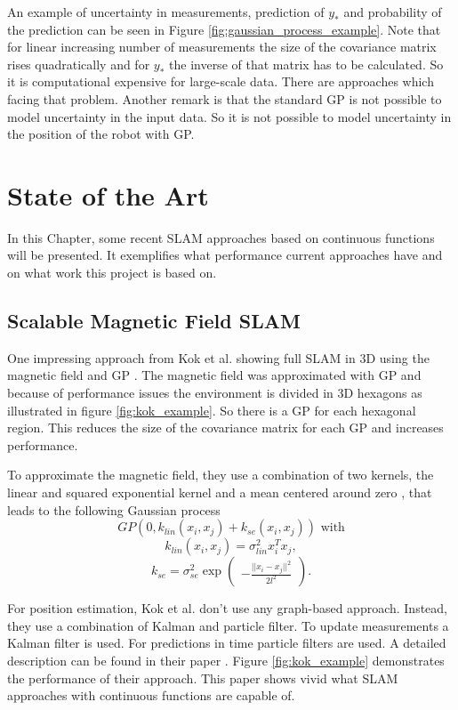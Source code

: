 An example of uncertainty in measurements, prediction of $y_*$ and probability of the prediction can be seen in Figure \ref{fig:gaussian_process_example}. Note that for linear increasing number of measurements the size of the covariance matrix rises quadratically and for $y_*$ the inverse of that matrix has to be calculated. So it is computational expensive for large-scale data. There are approaches which facing that problem. Another remark is that the standard GP is not possible to model uncertainty in the input data. So it is not possible to model uncertainty in the position of the robot with GP. 

\section{State of the Art}
\label{chap:stat_of_the_art}

In this Chapter, some recent SLAM approaches based on continuous functions will be presented. It exemplifies what performance current approaches have and on what work this project is based on. 

\subsection{Scalable Magnetic Field SLAM}
\label{sec:scalable_magnetic_slam}

One impressing approach from Kok et al. showing full SLAM in 3D using the magnetic field and GP \cite{kok_scalable_2018}. The magnetic field was approximated with GP and because of performance issues the environment is divided in 3D hexagons as illustrated in figure \ref{fig:kok_example}. So there is a GP for each hexagonal region. This reduces the size of the covariance matrix for each GP and increases performance. 

To approximate the magnetic field, they use a combination of two kernels, the linear and squared exponential kernel and a mean centered around zero \cite{kok_scalable_2018}, that leads to the 
following Gaussian process
$$
GP(0, k_{lin}(x_i, x_j) + k_{se}(x_i, x_j)) \text{ with}
$$
$$
k_{lin}(x_i, x_j) = \sigma_{lin}^2 x_i^T x_j, 
$$
$$
k_{se} = \sigma_{se}^2 \exp 
\begin{pmatrix}
-\frac{||x_i - x_j||^2}{2l^2}
\end{pmatrix}\text{.}
$$

For position estimation, Kok et al. don't use any graph-based approach. Instead, they use a combination of Kalman and particle filter. To update measurements a Kalman filter is used. For predictions in time particle filters are used. A detailed description can be found in their paper \cite{kok_scalable_2018}. Figure \ref{fig:kok_example} demonstrates the performance of their approach. This paper shows vivid what SLAM approaches with continuous functions are capable of.

